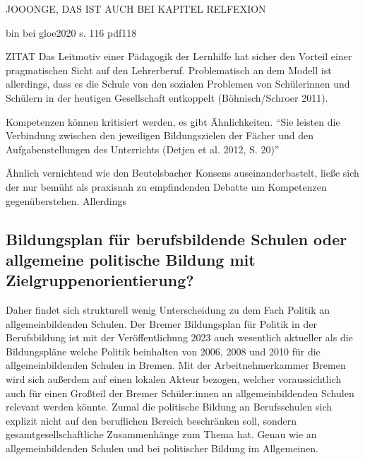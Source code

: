 JOOONGE, DAS IST AUCH BEI KAPITEL RELFEXION

bin bei gloe2020 s. 116 pdf118


ZITAT
Das Leitmotiv einer Pädagogik der Lernhilfe hat sicher den Vorteil einer pragmatischen Sicht auf den Lehrerberuf. Problematisch an dem Modell ist allerdings, dass es die Schule von den sozialen Problemen von Schülerinnen und Schülern in der heutigen Gesellschaft entkoppelt (Böhnisch/Schroer 2011). \autocite[51]{Sander.2016}

Kompetenzen können kritisiert werden, es gibt Ähnlichkeiten. \enquote{Sie leisten die Verbindung zwischen den jeweiligen Bildungszielen der Fächer und den Aufgabenstellungen des Unterrichts (Detjen et al. 2012, S. 20)} \autocite[18]{Massing.2022}

Ähnlich vernichtend wie \textcite[][]{Roler2016} den Beutelsbacher Konsens auseinanderbastelt, ließe sich der nur bemüht als praxisnah zu empfindenden Debatte um Kompetenzen gegenüberstehen. Allerdings 

\subsection{Bildungsplan für berufsbildende Schulen oder allgemeine politische Bildung mit Zielgruppenorientierung?}
Daher findet sich strukturell wenig Unterscheidung zu dem Fach Politik an allgemeinbildenden Schulen.
Der Bremer Bildungsplan für Politik in der Berufsbildung ist mit der Veröffentlichung 2023 auch wesentlich aktueller als die Bildungspläne welche Politik beinhalten von 2006, 2008 und 2010 für die allgemeinbildenden Schulen in Bremen. 
Mit der Arbeitnehmerkammer Bremen wird sich außerdem auf einen lokalen Akteur bezogen, welcher voraussichtlich auch für einen Großteil der Bremer Schüler:innen an allgemeinbildenden Schulen relevant werden könnte. 
Zumal die politische Bildung an Berufsschulen sich explizit nicht auf den beruflichen Bereich beschränken soll, sondern gesamtgesellschaftliche Zusammenhänge zum Thema hat. Genau wie an allgemeinbildenden Schulen und bei politischer Bildung im Allgemeinen.

